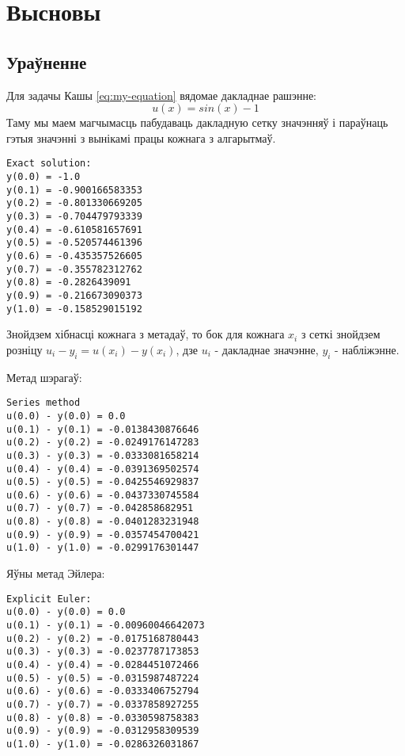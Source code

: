 \section*{Высновы}

\subsection*{Ураўненне}

Для задачы Кашы \eqref{eq:my-equation} вядомае дакладнае рашэнне:
\begin{equation}
    u(x) = sin(x) - 1
\end{equation}
Таму мы маем магчымасць пабудаваць дакладную сетку значэнняў і параўнаць гэтыя значэнні з вынікамі працы кожнага з алгарытмаў.

{\small
\begin{verbatim}
Exact solution:
y(0.0) = -1.0
y(0.1) = -0.900166583353
y(0.2) = -0.801330669205
y(0.3) = -0.704479793339
y(0.4) = -0.610581657691
y(0.5) = -0.520574461396
y(0.6) = -0.435357526605
y(0.7) = -0.355782312762
y(0.8) = -0.2826439091
y(0.9) = -0.216673090373
y(1.0) = -0.158529015192
\end{verbatim}
}

Знойдзем хібнасці кожнага з метадаў, то бок для кожнага $x_i$ з сеткі знойдзем розніцу $u_i - y_i = u(x_i) - y(x_i)$, дзе $u_i$ - дакладнае значэнне, $y_i$ - набліжэнне.\par
\vspace{5mm}
Метад шэрагаў:
{\small
\begin{verbatim}
Series method
u(0.0) - y(0.0) = 0.0
u(0.1) - y(0.1) = -0.0138430876646
u(0.2) - y(0.2) = -0.0249176147283
u(0.3) - y(0.3) = -0.0333081658214
u(0.4) - y(0.4) = -0.0391369502574
u(0.5) - y(0.5) = -0.0425546929837
u(0.6) - y(0.6) = -0.0437330745584
u(0.7) - y(0.7) = -0.042858682951
u(0.8) - y(0.8) = -0.0401283231948
u(0.9) - y(0.9) = -0.0357454700421
u(1.0) - y(1.0) = -0.0299176301447
\end{verbatim}
}

Яўны метад Эйлера:
{\small
\begin{verbatim}
Explicit Euler:
u(0.0) - y(0.0) = 0.0
u(0.1) - y(0.1) = -0.00960046642073
u(0.2) - y(0.2) = -0.0175168780443
u(0.3) - y(0.3) = -0.0237787173853
u(0.4) - y(0.4) = -0.0284451072466
u(0.5) - y(0.5) = -0.0315987487224
u(0.6) - y(0.6) = -0.0333406752794
u(0.7) - y(0.7) = -0.0337858927255
u(0.8) - y(0.8) = -0.0330598758383
u(0.9) - y(0.9) = -0.0312958309539
u(1.0) - y(1.0) = -0.0286326031867
\end{verbatim}
}

